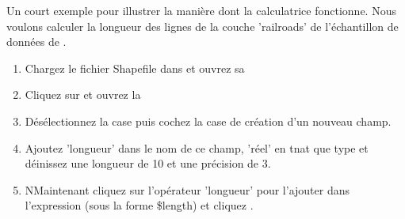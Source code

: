 Un court exemple pour illustrer la manière dont la calculatrice fonctionne. Nous voulons calculer la longueur des lignes de la couche 'railroads' de l'échantillon de données de \qg.

\begin{enumerate}
\item Chargez le fichier Shapefile  dans \qg et ouvrez sa 
\item Cliquez sur et ouvrez la 
\item Désélectionnez la case  puis cochez la case de création d'un nouveau champ.
\item Ajoutez 'longueur' dans le nom de ce champ, 'réel' en tnat que type et déinissez une longueur de 10 et une précision de 3.
\item NMaintenant cliquez sur l'opérateur 'longueur' pour l'ajouter dans l'expression (sous la forme \$length) et cliquez .
\end{enumerate}

\FloatBarrier
